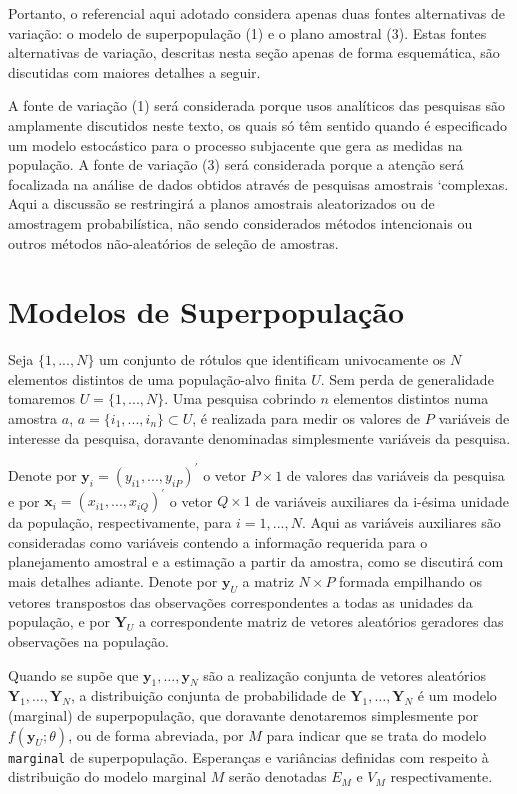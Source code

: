 \documentclass[]{book}
\numberwithin{example}{chapter}
\numberwithin{remark}{chapter}
\numberwithin{definition}{chapter}
\begin{document}
Portanto, o referencial aqui adotado considera apenas duas fontes
alternativas de variação: o modelo de superpopulação (1) e o plano
amostral (3). Estas fontes alternativas de variação, descritas nesta
seção apenas de forma esquemática, são discutidas com maiores detalhes a
seguir.

A fonte de variação (1) será considerada porque usos analíticos das
pesquisas são amplamente discutidos neste texto, os quais só têm sentido
quando é especificado um modelo estocástico para o processo subjacente
que gera as medidas na população. A fonte de variação (3) será
considerada porque a atenção será focalizada na análise de dados obtidos
através de pesquisas amostrais `complexas. Aqui a discussão se
restringirá a planos amostrais aleatorizados ou de amostragem
probabilística, não sendo considerados métodos intencionais ou outros
métodos não-aleatórios de seleção de amostras.

\section{Modelos de Superpopulação}\label{modelos-de-superpopulacao}

Seja \(\{1,...,N\}\) um conjunto de rótulos que identificam univocamente
os \(N\) elementos distintos de uma população-alvo finita \(U\). Sem
perda de generalidade tomaremos \(U=\{1,...,N\}\). Uma pesquisa cobrindo
\(n\) elementos distintos numa amostra \(a\),
\(a=\{i_{1},...,i_{n}\}\subset U\), é realizada para medir os valores de
\(P\) variáveis de interesse da pesquisa, doravante denominadas
simplesmente variáveis da pesquisa.

Denote por \(\mathbf{y}_i=(y_{i1},...,y_{iP})^{\prime }\) o vetor
\(P\times 1\) de valores das variáveis da pesquisa e por
\(\mathbf{x}_{i}=(x_{i1},...,x_{iQ})^{\prime }\) o vetor \(Q\times 1\)
de variáveis auxiliares da i-ésima unidade da população,
respectivamente, para \(i=1,...,N\). Aqui as variáveis auxiliares são
consideradas como variáveis contendo a informação requerida para o
planejamento amostral e a estimação a partir da amostra, como se
discutirá com mais detalhes adiante. Denote por \(\mathbf{y}_{U}\) a
matriz \(N \times P\) formada empilhando os vetores transpostos das
observações correspondentes a todas as unidades da população, e por
\(\mathbf{Y}_{U}\) a correspondente matriz de vetores aleatórios
geradores das observações na população.

Quando se supõe que \(\mathbf{y}_1 ,\ldots, \mathbf{y}_N\) são a
realização conjunta de vetores aleatórios
\(\mathbf{Y}_1 ,\ldots, \mathbf{Y}_N\), a distribuição conjunta de
probabilidade de \(\mathbf{Y}_1 ,\ldots, \mathbf{Y}_N\) é um modelo
(marginal) de superpopulação, que doravante denotaremos simplesmente por
\(f(\mathbf{y}_U;\theta)\), ou de forma abreviada, por \(M\) para
indicar que se trata do modelo \texttt{marginal} de superpopulação.
Esperanças e variâncias definidas com respeito à distribuição do modelo
marginal \(M\) serão denotadas \(E_M\) e \(V_M\) respectivamente.
\end{document}
